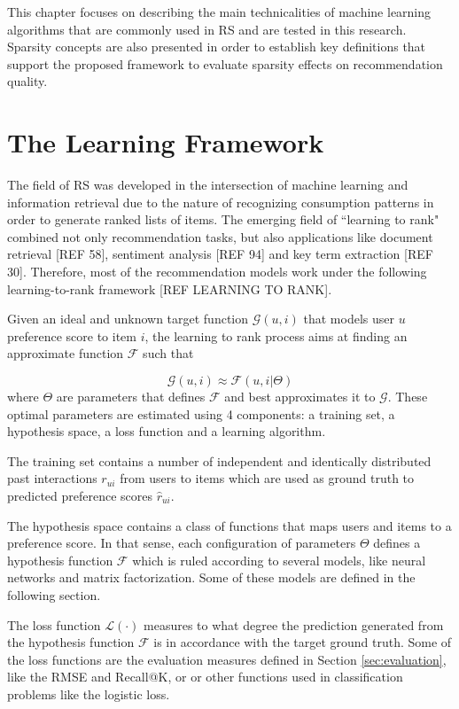 This chapter focuses on describing the main technicalities of machine learning algorithms that are commonly used in RS and are tested in this research. Sparsity concepts are also presented in order to establish key definitions that support the proposed framework to evaluate sparsity effects on recommendation quality.

\section{The Learning Framework}

The field of RS was developed in the intersection of machine learning and information retrieval due to the nature of recognizing consumption patterns in order to generate ranked lists of items. The emerging field of ``learning to rank" combined not only recommendation tasks, but also applications like document retrieval [REF 58], sentiment analysis [REF 94] and key term extraction [REF 30]. Therefore, most of the recommendation models work under the following learning-to-rank framework [REF LEARNING TO RANK]. 

Given an ideal and unknown target function $\mathcal{G}(u, i)$ that models user $u$ preference score to item $i$, the learning to rank process aims at finding an approximate function $\mathcal{F}$ such that 

\begin{equation}
    \mathcal{G}(u, i) \approx \mathcal{F}(u, i | \Theta)
\end{equation} where $\Theta$ are parameters that defines $\mathcal{F}$ and best approximates it to $\mathcal{G}$. These optimal parameters are estimated using 4 components: a training set, a hypothesis space, a loss function and a learning algorithm.


The training set contains a number of independent and identically distributed past interactions $r_{ui}$ from users to items which are used as ground truth to predicted preference scores $\hat{r}_{ui}$.

The hypothesis space contains a class of functions that maps users and items to a preference score. In that sense, each configuration of parameters $\Theta$ defines a hypothesis function $\mathcal{F}$ which is ruled according to several models, like neural networks and matrix factorization. Some of these models are defined in the following section.

The loss function $\mathcal{L}(\cdot)$ measures to what degree the prediction generated from the hypothesis function $\mathcal{F}$ is in accordance with the target ground truth. Some of the loss functions are the evaluation measures defined in Section \ref{sec:evaluation}, like the RMSE and Recall@K, or or other functions used in classification problems like the logistic loss. 

